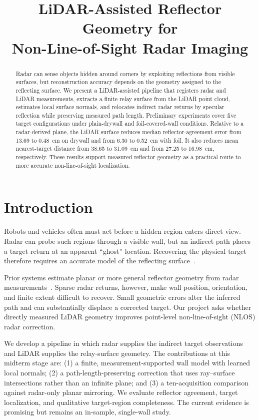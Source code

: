 \documentclass[conference]{IEEEtran}
\title{LiDAR-Assisted Reflector Geometry for\\Non-Line-of-Sight Radar Imaging}
\author{\IEEEauthorblockN{Steven Chen}}
\begin{document}
\maketitle

\begin{abstract}
Radar can sense objects hidden around corners by exploiting reflections from visible surfaces, but reconstruction accuracy depends on the geometry assigned to the reflecting surface. We present a LiDAR-assisted pipeline that registers radar and LiDAR measurements, extracts a finite relay surface from the LiDAR point cloud, estimates local surface normals, and relocates indirect radar returns by specular reflection while preserving measured path length. Preliminary experiments cover five target configurations under plain-drywall and foil-covered-wall conditions. Relative to a radar-derived plane, the LiDAR surface reduces median reflector-agreement error from 13.69 to 0.48~cm on drywall and from 6.30 to 0.52~cm with foil. It also reduces mean nearest-target distance from 38.65 to 31.09~cm and from 27.25 to 16.98~cm, respectively. These results support measured reflector geometry as a practical route to more accurate non-line-of-sight localization.
\end{abstract}

\section{Introduction}
Robots and vehicles often must act before a hidden region enters direct view. Radar can probe such regions through a visible wall, but an indirect path places a target return at an apparent ``ghost'' location. Recovering the physical target therefore requires an accurate model of the reflecting surface~\cite{scheiner2020corners,dodds2024rflect,cui2024seeing}.

Prior systems estimate planar or more general reflector geometry from radar measurements~\cite{cui2024seeing,dodds2024rflect}. Sparse radar returns, however, make wall position, orientation, and finite extent difficult to recover. Small geometric errors alter the inferred path and can substantially displace a corrected target. Our project asks whether directly measured LiDAR geometry improves point-level non-line-of-sight (NLOS) radar correction.

We develop a pipeline in which radar supplies the indirect target observations and LiDAR supplies the relay-surface geometry. The contributions at this midterm stage are: (1) a finite, measurement-supported wall model with learned local normals; (2) a path-length-preserving correction that uses ray--surface intersections rather than an infinite plane; and (3) a ten-acquisition comparison against radar-only planar mirroring. We evaluate reflector agreement, target localization, and qualitative target-region completeness. The current evidence is promising but remains an in-sample, single-wall study.
\end{document}
